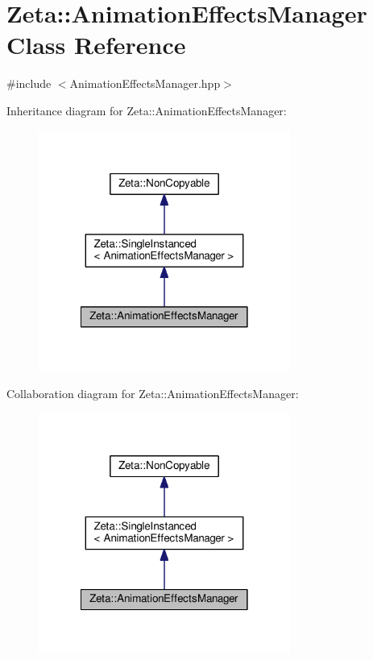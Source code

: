 \hypertarget{classZeta_1_1AnimationEffectsManager}{\section{Zeta\+:\+:Animation\+Effects\+Manager Class Reference}
\label{classZeta_1_1AnimationEffectsManager}
}


{\ttfamily \#include $<$Animation\+Effects\+Manager.\+hpp$>$}



Inheritance diagram for Zeta\+:\+:Animation\+Effects\+Manager\+:\nopagebreak
\begin{figure}[H]
\begin{center}
\leavevmode
\includegraphics[width=234pt]{classZeta_1_1AnimationEffectsManager__inherit__graph}
\end{center}
\end{figure}


Collaboration diagram for Zeta\+:\+:Animation\+Effects\+Manager\+:\nopagebreak
\begin{figure}[H]
\begin{center}
\leavevmode
\includegraphics[width=234pt]{classZeta_1_1AnimationEffectsManager__coll__graph}
\end{center}
\end{figure}
